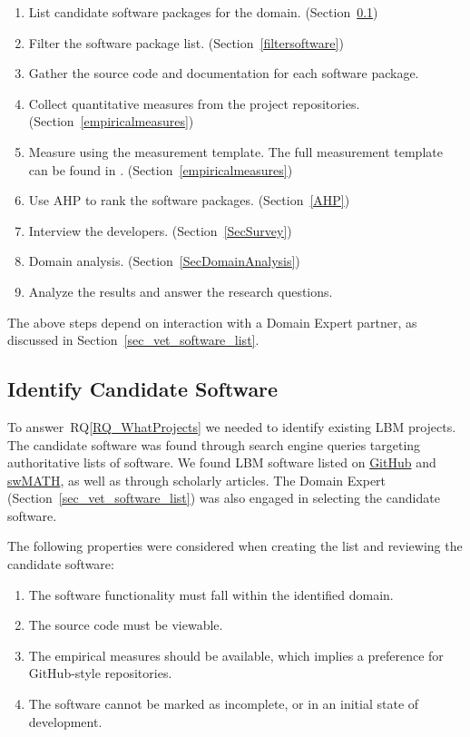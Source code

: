 \documentclass[final, 3p, times, authoryear]{elsarticle}
\newcommand{\rqref}[1]{RQ\ref{#1}}
\begin{document}
\begin{enumerate}
	\item List candidate software packages for the domain.
	(Section~\ref{identifysoftware})
	\item Filter the software package list. (Section~\ref{filtersoftware})
	\item Gather the source code and documentation for each software package.
	\item Collect quantitative measures from the project repositories.
	(Section~\ref{empiricalmeasures})
	\item Measure using the measurement template.  The full measurement template
	can be found in \citet{SmithEtAl2021}. (Section~\ref{empiricalmeasures})
	\item Use AHP to rank the software packages. (Section~\ref{AHP})
	\item Interview the developers. (Section~\ref{SecSurvey})
	\item Domain analysis. (Section~\ref{SecDomainAnalysis})
	\item Analyze the results and answer the research questions.
\end{enumerate}

\noindent The above steps depend on interaction with a Domain Expert partner, as
discussed in Section~\ref{sec_vet_software_list}.

\subsection{Identify Candidate Software} \label{identifysoftware}

To answer~\rqref{RQ_WhatProjects} we needed to identify existing LBM projects.
The candidate software was found through search engine queries targeting
authoritative lists of software. We found LBM software listed on
\href{https://github.com/} {GitHub} and \href{https://swmath.org/} {swMATH}, as
well as through scholarly articles. The Domain Expert
(Section~\ref{sec_vet_software_list}) was also engaged in selecting the
candidate software.

The following properties were considered when creating the list and reviewing
the candidate software:

\begin{enumerate}
	\item The software functionality must fall within the identified domain.
	\item The source code must be viewable.
	\item The empirical measures should be available, which implies a preference
	for GitHub-style repositories.
	\item The software cannot be marked as incomplete, or in an initial state of
	development.
\end{enumerate}
\end{document}
